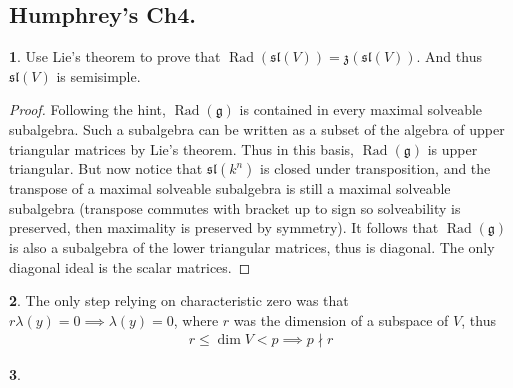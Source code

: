 \documentclass[10.5pt]{article}
\theoremstyle{definition}
\newtheorem{pb}{}
\numberwithin{example}{subsection}
\numberwithin{proposition}{subsection}
\numberwithin{pb}{subsection}
\begin{document}
        \subsection{Humphrey's Ch4.}
            \begin{pb}
                Use Lie's theorem to prove that \(\operatorname{Rad}(\mathfrak{sl}(V)) = \mathfrak{z}(\mathfrak{sl}(V))\). And thus \(\mathfrak{sl}(V)\) is semisimple.

                \begin{proof}
                    Following the hint, \(\operatorname{Rad}(\mathfrak{g})\) is contained in every maximal solveable subalgebra. Such a subalgebra can be written as a subset of the algebra of upper triangular matrices by Lie's theorem. Thus in this basis, \(\operatorname{Rad}(\mathfrak{g})\) is upper triangular. But now notice that \(\mathfrak{sl}(k^n)\) is closed under transposition, and the transpose of a maximal solveable subalgebra is still a maximal solveable subalgebra (transpose commutes with bracket up to sign so solveability is preserved, then maximality is preserved by symmetry). It follows that \(\operatorname{Rad}(\mathfrak{g})\) is also a subalgebra of the lower triangular matrices, thus is diagonal. The only diagonal ideal is the scalar matrices.
                \end{proof}
            \end{pb}
            \begin{pb}
                The only step relying on characteristic zero was that \(r \lambda(y) = 0 \implies \lambda(y) = 0\), where \(r\) was the dimension of a subspace of \(V\), thus
                \begin{align}
                    r \leq \dim V < p \implies p \nmid r
                \end{align}
            \end{pb}
            \begin{pb}
                
            \end{pb}
\end{document}
